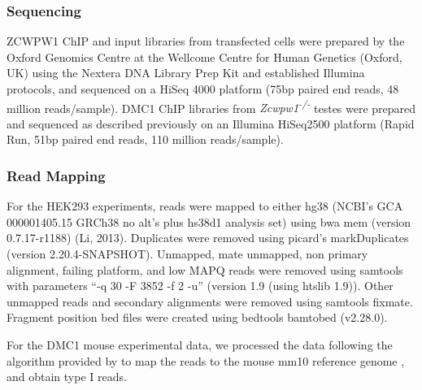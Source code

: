 \subsubsection{Sequencing}
ZCWPW1 ChIP and input libraries from transfected cells were prepared by the Oxford Genomics Centre at the Wellcome Centre for Human Genetics (Oxford, UK) using the Nextera DNA Library Prep Kit and established Illumina protocols, and sequenced on a HiSeq 4000 platform (75bp paired end reads, 48 million reads/sample). DMC1 ChIP libraries from \textit{Zcwpw1\textsuperscript{-/-}} testes were prepared and sequenced as described previously \parencite{Davies2016Reengineering} on an Illumina HiSeq2500 platform (Rapid Run, 51bp paired end reads, 110 million reads/sample). 

\subsubsection{Read Mapping}
For the HEK293 experiments, reads were mapped to either hg38 (NCBI’s GCA 000001405.15 GRCh38 no alt's plus hs38d1 analysis set) using bwa mem (version 0.7.17-r1188) (Li, 2013). Duplicates were removed using picard’s markDuplicates (version 2.20.4-SNAPSHOT). Unmapped, mate unmapped, non primary alignment, failing platform, and low MAPQ reads were removed using samtools with parameters “-q 30 -F 3852 -f 2 -u” (version 1.9 (using htslib 1.9)). Other unmapped reads and secondary alignments were removed using samtools fixmate. Fragment position bed files were created using bedtools bamtobed (v2.28.0).

For the DMC1 mouse experimental data, we processed the data following the algorithm provided by \parencite{Khil2012Sensitive} to map the reads to the mouse mm10 reference genome \parencite{Lunter2011Stampy}, and obtain type I reads.


